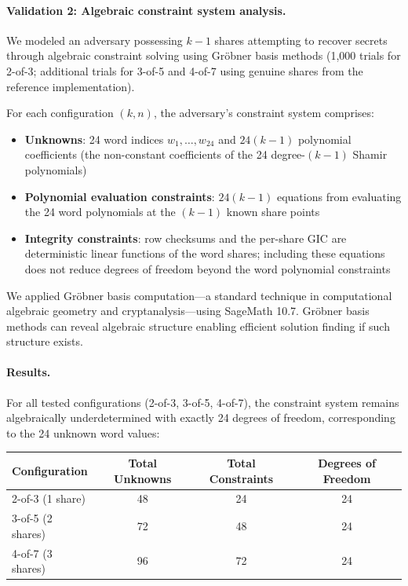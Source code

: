 \documentclass[11pt]{article}
\begin{document}
\paragraph{Validation 2: Algebraic constraint system analysis.} We modeled an adversary possessing $k-1$ shares attempting to recover secrets through algebraic constraint solving using Gröbner basis methods (1,000 trials for 2-of-3; additional trials for 3-of-5 and 4-of-7 using genuine shares from the reference implementation).

For each configuration $(k, n)$, the adversary's constraint system comprises:
\begin{itemize}[noitemsep]
    \item \textbf{Unknowns}: 24 word indices $w_1, \ldots, w_{24}$ and $24(k-1)$ polynomial coefficients (the non-constant coefficients of the 24 degree-$(k-1)$ Shamir polynomials)
    \item \textbf{Polynomial evaluation constraints}: $24(k-1)$ equations from evaluating the 24 word polynomials at the $(k-1)$ known share points
    \item \textbf{Integrity constraints}: row checksums and the per-share GIC are deterministic linear functions of the word shares; including these equations does not reduce degrees of freedom beyond the word polynomial constraints
\end{itemize}

We applied Gröbner basis computation—a standard technique in computational algebraic geometry and cryptanalysis—using SageMath 10.7. Gröbner basis methods can reveal algebraic structure enabling efficient solution finding if such structure exists.

\paragraph{Results.} For all tested configurations (2-of-3, 3-of-5, 4-of-7), the constraint system remains algebraically underdetermined with exactly 24 degrees of freedom, corresponding to the 24 unknown word values:

\begin{center}
\begin{tabular}{lccc}
\toprule
Configuration & Total Unknowns & Total Constraints & Degrees of Freedom \\
\midrule
2-of-3 (1 share) & 48 & 24 & 24 \\
3-of-5 (2 shares) & 72 & 48 & 24 \\
4-of-7 (3 shares) & 96 & 72 & 24 \\
\bottomrule
\end{tabular}
\end{center}
\end{document}
